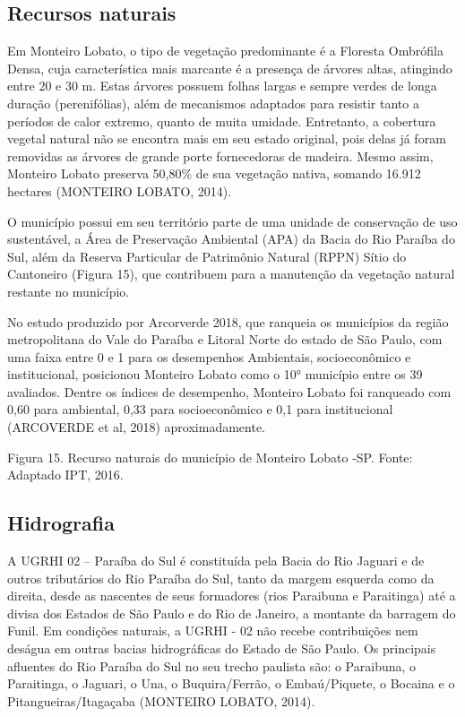 \subsection{Recursos naturais}

Em Monteiro Lobato, o tipo de vegetação predominante é a Floresta Ombrófila Densa, cuja característica mais marcante é a presença de árvores altas, atingindo entre 20 e 30 m.  Estas árvores possuem folhas largas e sempre verdes de longa duração (perenifólias), além de mecanismos adaptados para resistir tanto a períodos de calor extremo, quanto de muita umidade. Entretanto, a cobertura vegetal natural não se encontra mais em seu estado original, pois delas já foram removidas as árvores de grande porte fornecedoras de madeira. Mesmo assim, Monteiro Lobato preserva 50,80\% de sua vegetação nativa, somando 16.912 hectares (MONTEIRO LOBATO, 2014).

O município possui em seu território parte de uma unidade de conservação de uso sustentável, a Área de Preservação Ambiental (APA) da Bacia do Rio Paraíba do Sul, além da Reserva Particular de Patrimônio Natural (RPPN) Sítio do Cantoneiro (Figura 15), que contribuem para a manutenção da vegetação natural restante no município. 

No estudo produzido por Arcorverde 2018, que ranqueia os municípios da região metropolitana do Vale do Paraíba e Litoral Norte do estado de São Paulo, com uma faixa entre 0 e 1 para os desempenhos Ambientais, socioeconômico e institucional, posicionou Monteiro Lobato como o 10° município entre os 39 avaliados.   Dentre os índices de desempenho, Monteiro Lobato foi ranqueado com 0,60 para ambiental, 0,33 para socioeconômico e 0,1 para institucional (ARCOVERDE et al, 2018) aproximadamente.  


 Figura 15. Recurso naturais do município de Monteiro Lobato -SP.
Fonte: Adaptado IPT, 2016.

\subsection{Hidrografia}

A UGRHI  02 – Paraíba do Sul é constituída pela Bacia do Rio Jaguari e de outros tributários do Rio Paraíba do Sul, tanto da margem esquerda como da direita, desde as nascentes de seus formadores (rios Paraibuna e Paraitinga) até a divisa dos Estados de São Paulo e do Rio de Janeiro, a montante da barragem do Funil. Em condições naturais, a UGRHI - 02 não recebe contribuições nem deságua em outras bacias hidrográficas do Estado de São Paulo. Os principais afluentes do Rio Paraíba do Sul no seu trecho paulista são: o Paraibuna, o Paraitinga, o Jaguari, o Una, o Buquira/Ferrão, o Embaú/Piquete, o Bocaina e o Pitangueiras/Itagaçaba (MONTEIRO LOBATO, 2014).

